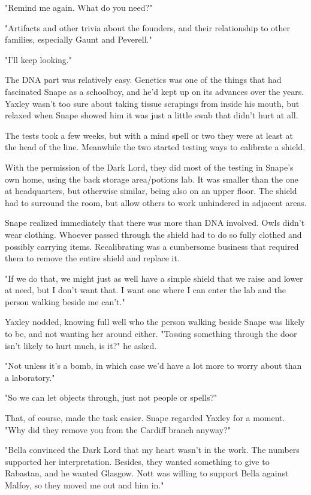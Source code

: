 \documentclass[a4paper,11pt]{article}
\begin{document}
"Remind me again. What do you need?"

"Artifacts and other trivia about the founders, and their relationship to other families, especially Gaunt and Peverell."

"I'll keep looking."

The DNA part was relatively easy. Genetics was one of the things that had fascinated Snape as a schoolboy, and he'd kept up on its advances over the years. Yaxley wasn't too sure about taking tissue scrapings from inside his mouth, but relaxed when Snape showed him it was just a little swab that didn't hurt at all.

The tests took a few weeks, but with a mind spell or two they were at least at the head of the line. Meanwhile the two started testing ways to calibrate a shield.

With the permission of the Dark Lord, they did most of the testing in Snape's own home, using the back storage area/potions lab. It was smaller than the one at headquarters, but otherwise similar, being also on an upper floor. The shield had to surround the room, but allow others to work unhindered in adjacent areas.

Snape realized immediately that there was more than DNA involved. Owls didn't wear clothing. Whoever passed through the shield had to do so fully clothed and possibly carrying items. Recalibrating was a cumbersome business that required them to remove the entire shield and replace it.

"If we do that, we might just as well have a simple shield that we raise and lower at need, but I don't want that. I want one where I can enter the lab and the person walking beside me can't."

Yaxley nodded, knowing full well who the person walking beside Snape was likely to be, and not wanting her around either. "Tossing something through the door isn't likely to hurt much, is it?" he asked.

"Not unless it's a bomb, in which case we'd have a lot more to worry about than a laboratory."

"So we can let objects through, just not people or spells?"

That, of course, made the task easier. Snape regarded Yaxley for a moment. "Why did they remove you from the Cardiff branch anyway?"

"Bella convinced the Dark Lord that my heart wasn't in the work. The numbers supported her interpretation. Besides, they wanted something to give to Rabastan, and he wanted Glasgow. Nott was willing to support Bella against Malfoy, so they moved me out and him in."
\end{document}
